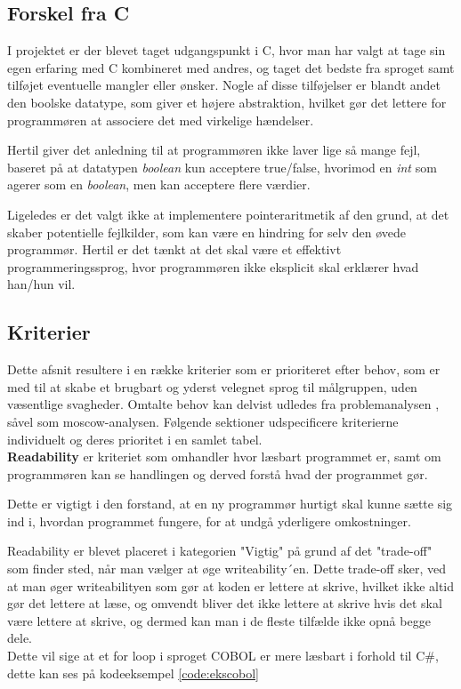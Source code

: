 \subsection{Forskel fra C}
\label{sec:forskelfrac}
I projektet er der blevet taget udgangspunkt i C, hvor man har valgt at tage sin egen erfaring med C kombineret med andres, og taget det bedste fra sproget samt tilføjet eventuelle mangler eller ønsker.
Nogle af disse tilføjelser er blandt andet den boolske datatype, som giver et højere abstraktion, hvilket gør det  lettere for programmøren at associere det med virkelige hændelser.

Hertil giver det anledning til at programmøren ikke laver lige så mange fejl, baseret på at datatypen \textit{boolean} kun acceptere true/false, hvorimod en \textit{int} som agerer som en \textit{boolean}, men kan acceptere flere værdier.

Ligeledes er det valgt ikke at implementere pointeraritmetik af den grund, at det skaber potentielle fejlkilder, som kan være en hindring for selv den øvede programmør. Hertil er det tænkt at det skal være et effektivt programmeringssprog, hvor programmøren ikke eksplicit skal erklærer hvad han/hun vil.

\subsection{Kriterier}
Dette afsnit resultere i en række kriterier som er prioriteret efter behov, som er med til at skabe et brugbart og yderst velegnet sprog til målgruppen, uden væsentlige svagheder. Omtalte behov kan delvist udledes fra problemanalysen , såvel som \gls{moscow}-analysen.
Følgende sektioner udspecificere kriterierne individuelt og deres prioritet i en samlet tabel.\\

\noindent\textbf{Readability} er kriteriet som omhandler hvor læsbart programmet er, samt om programmøren kan se handlingen og derved forstå hvad der programmet gør.

Dette er vigtigt i den forstand, at en ny programmør hurtigt skal kunne sætte sig ind i, hvordan programmet fungere, for at undgå yderligere omkostninger. 

Readability er blevet placeret i kategorien "Vigtig" på grund af det "trade-off" som finder sted, når man vælger at øge writeability´en.
Dette trade-off sker, ved at man øger writeabilityen som gør at koden er lettere at skrive, hvilket ikke altid gør det lettere at læse, og omvendt bliver det ikke lettere at skrive hvis det skal være lettere at skrive, og dermed kan man i de fleste tilfælde ikke opnå begge dele.
\\
Dette vil sige at et for loop i sproget COBOL er mere læsbart i forhold til C\#, dette kan ses på kodeeksempel \ref{code:ekscobol}

